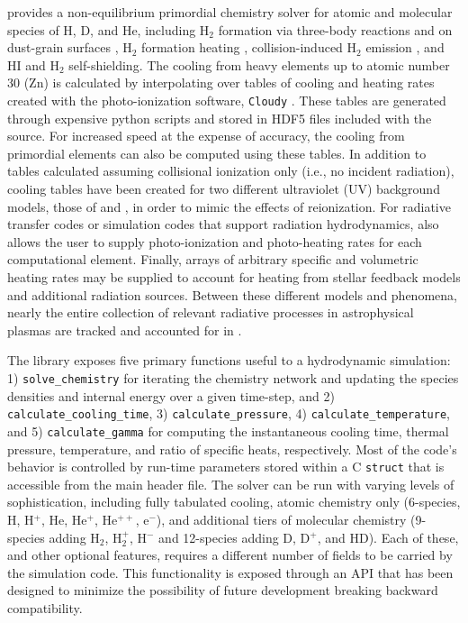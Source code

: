 \grackle{} provides a non-equilibrium primordial chemistry solver for
atomic and molecular species of H, D, and He, including H$_{2}$
formation via three-body reactions \citep{2002Sci...295...93A,
2011ApJ...726...55T} and on dust-grain surfaces
\citep{1979ApJS...41..555H, 2000ApJ...534..809O, 2014ApJ...783...75M},
H$_{2}$ formation 
heating \citep{2009Sci...325..601T}, collision-induced H$_{2}$
emission \citep{2004MNRAS.348.1019R}, and HI
\citep{2013MNRAS.430.2427R} and H$_{2}$ \citep{2012MNRAS.425L..51W}
self-shielding.  The cooling from heavy elements up to atomic number
30 (Zn) is calculated by interpolating over tables of cooling and
heating rates created with the photo-ionization software,
\texttt{Cloudy} \citep{2013RMxAA..49..137F}.  These
tables are generated through expensive python scripts and stored in HDF5 files
included with the \grackle{} source.  For
increased speed at the expense of accuracy, the cooling from
primordial elements can also be computed using these tables.  In
addition to tables calculated assuming collisional ionization only
(i.e., no incident radiation), cooling tables have been created for two
different ultraviolet (UV) background models, those of \citet{2009ApJ...703.1416F}
and \citet{2012ApJ...746..125H}, in order to mimic the effects of
reionization.  For radiative transfer codes or simulation codes that
support radiation hydrodynamics, \grackle{} also allows the user to supply
photo-ionization and photo-heating rates for each computational
element.  Finally, arrays of arbitrary specific and volumetric heating
rates may be supplied to account for heating from stellar feedback
models and additional radiation sources.  Between these different models and
phenomena, nearly the entire collection of relevant radiative processes in
astrophysical plasmas are tracked and accounted for in \grackle{}.

The \grackle{} library exposes five primary functions useful to a
hydrodynamic simulation: 1) \texttt{solve\_chemistry} for iterating
the chemistry network and updating the species densities and internal
energy over a given time-step, and 2)
\texttt{calculate\_cooling\_time}, 3) \texttt{calculate\_pressure}, 4)
\texttt{calculate\_temperature}, and 5) \texttt{calculate\_gamma} for
computing the instantaneous cooling time, thermal pressure,
temperature, and ratio of specific heats, respectively.  Most of the
code's behavior is controlled by run-time parameters stored within a C
\texttt{struct} that is accessible from the main \grackle{} header
file.  The solver can be run with varying levels of sophistication,
including fully tabulated cooling, atomic chemistry only (6-species,
H, H$^{+}$, He, He$^{+}$, He$^{++}$, e$^{-}$), and additional tiers of
molecular chemistry (9-species adding H$_{2}$, H$_{2}^{+}$, H$^{-}$
and 12-species adding D, D$^{+}$, and HD).  Each of these, and other
optional features, requires a different number of fields to be carried
by the simulation code.  This functionality is exposed through
an API that has been designed to minimize the possibility of future
development breaking backward compatibility.


